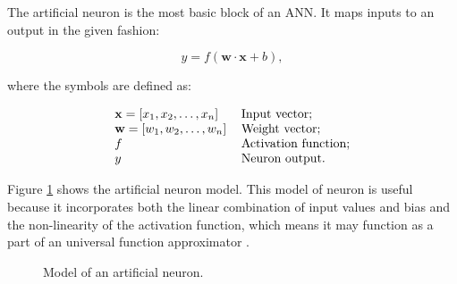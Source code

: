 The artificial neuron is the most basic block of an ANN. It maps inputs to an output in the given fashion:

\begin{equation} \label{eq:neuron_eq}
	y = f(\mathbf{w} \cdot \mathbf{x} + b),
\end{equation}

where the symbols are defined as:

\begin{equation} \label{eq:neuron_symbols}
	\begin{tabular}{ll}
		$\mathbf{x} = [x_1, x_2, \ldots, x_n]$ & Input vector;\\
		$\mathbf{w} = [w_1, w_2, \ldots, w_n]$ & Weight vector;\\
		$f$ & Activation function; \\
		$y$ & Neuron output.
	\end{tabular}
\end{equation}

Figure \ref{fig:neuron} shows the artificial neuron model. This model of neuron is useful because it incorporates both the linear combination of input values and bias and the non-linearity of the activation function, which means it may function as a part of an universal function approximator \cite{HORNIK1989}.

\begin{figure}[ht]
	\centering
	\caption{Model of an artificial neuron.} \label{fig:neuron}
\end{figure}

